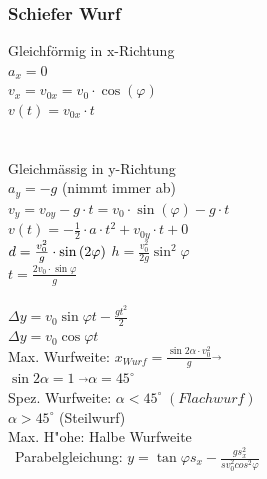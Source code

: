 	\subsubsection{Schiefer Wurf}
\begin{multicols}{3}
	Gleichförmig in x-Richtung \\
	$a_{x} = 0$ \\
	$v_{x} = v_{0x} = v_0 \cdot \cos(\varphi)$ \\
	$v(t)= v_{0x} \cdot t $\\
	\\
\columnbreak
	\\
	Gleichmässig in y-Richtung \\
	$a_{y} = -g$ (nimmt immer ab)\\
	$v_{y} = v_{oy} - g \cdot t = v_0 \cdot \sin(\varphi) - g \cdot t $ \\
	$v(t) = -\frac{1}{2} \cdot a \cdot t^2 + v_{0y} \cdot t + 0$ \\
	$d = \frac{v_{0}^2}{g} \cdot \sin{(2\varphi)} \\$
	$h = \frac{v_{0}^2}{2g}\sin^2{\varphi}$ \\
	$t = \frac{2v_{0} \cdot \sin{\varphi}}{g}$ \\
\columnbreak
\\
	$\Delta y = v_{0}\sin{\varphi}t - \frac{gt^2}{2}$ \\
	$\Delta y = v_{0}\cos{\varphi}t$ \\
	Max. Wurfweite: $x_{Wurf} = \frac{\sin2\alpha \cdot v_{0}^2}{g} \overrightarrow{}$ \\ $\sin2\alpha = 1 \; \overrightarrow{} \alpha = 45^\circ$ \\
	Spez. Wurfweite: $\alpha < 45^\circ \; (Flachwurf)$ \\
	$ \alpha > 45^\circ$ \; (Steilwurf)\\
	Max. H"ohe: Halbe Wurfweite \\
\	Parabelgleichung: $y = \tan{\varphi}s_{x} - \frac{gs_{x}^2}{sv_{0}^2cos^2{\varphi}}$ \\
\end{multicols}

